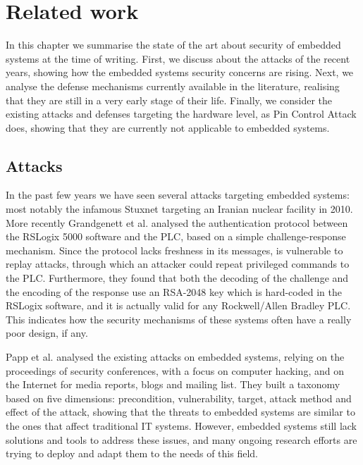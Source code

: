 \chapter{Related work}
\label{chap:related}

In this chapter we summarise the state of the art about security of embedded systems at the time of writing.
First, we discuss about the attacks of the recent years, showing how the embedded systems security concerns are rising.
Next, we analyse the defense mechanisms currently available in the literature, realising that they are still in a very early stage of their life.
Finally, we consider the existing attacks and defenses targeting the hardware level, as Pin Control Attack does,
showing that they are currently not applicable to embedded systems.


\section{Attacks}

In the past few years we have seen several attacks targeting embedded systems: most notably the infamous Stuxnet \cite{stuxnet} targeting an Iranian nuclear facility in 2010.
More recently Grandgenett et al. \cite{io-command} analysed the authentication protocol between the RSLogix 5000 software and the PLC, based on a simple challenge-response mechanism.
Since the protocol lacks freshness in its messages, is vulnerable to replay attacks, through which an attacker could repeat privileged commands to the PLC.
Furthermore, they found that both the decoding of the challenge and the encoding of the response use an RSA-2048 key which is hard-coded in the RSLogix software,
and it is actually valid for any Rockwell/Allen Bradley PLC.
This indicates how the security mechanisms of these systems often have a really poor design, if any.

Papp et al. \cite{taxonomy} analysed the existing attacks on embedded systems, relying on the proceedings of security conferences, with a focus on computer hacking,
and on the Internet for media reports, blogs and mailing list.
They built a taxonomy based on five dimensions: precondition, vulnerability, target, attack method and effect of the attack,
showing that the threats to embedded systems are similar to the ones that affect traditional IT systems.
However, embedded systems still lack solutions and tools to address these issues, and many ongoing research efforts are trying to deploy and adapt them to the needs of this field.

